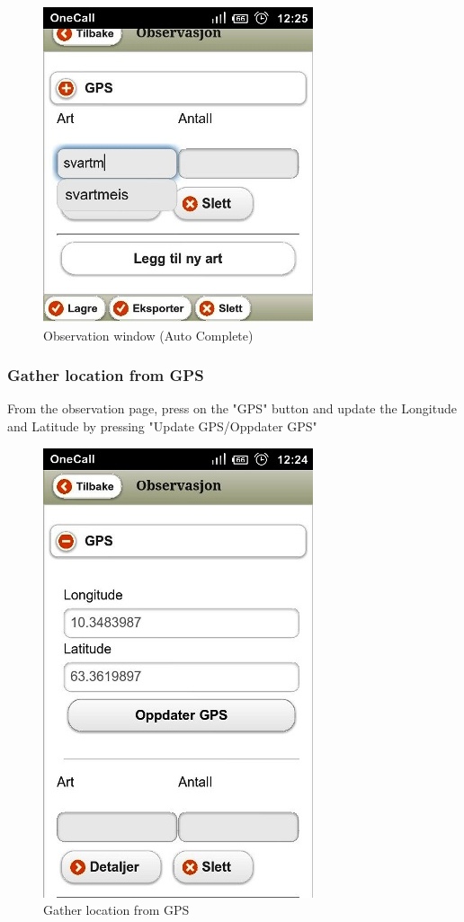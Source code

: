 \begin{figure}[h!]
\centering
 \includegraphics[scale=0.7]{appendix/pic/auto.jpg}
 \caption{Observation window (Auto Complete)}
 \end{figure}



\pagebreak
\subsubsection{Gather location from GPS}
From the observation page, press on the "GPS" button and update the Longitude and Latitude by pressing "Update GPS/Oppdater GPS"

\begin{figure}[h!]
\centering
 \includegraphics[scale=0.7]{appendix/pic/gps.jpg}
 \caption{Gather location from GPS}
 \end{figure}

